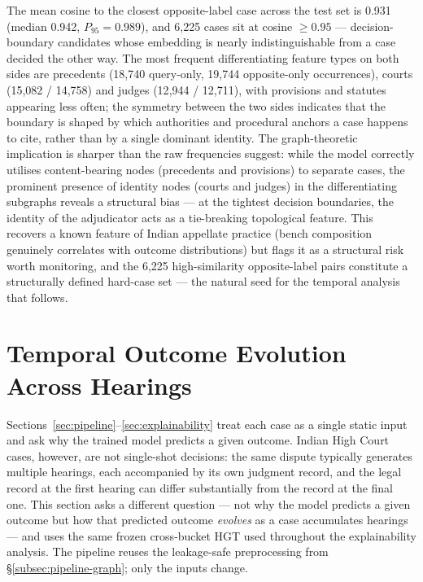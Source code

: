 \documentclass[runningheads]{llncs}
\begin{document}
The mean cosine to the closest opposite-label case across the test set is 0.931 (median 0.942, $P_{95}=0.989$), and 6{,}225 cases sit at cosine $\geq 0.95$ --- decision-boundary candidates whose embedding is nearly indistinguishable from a case decided the other way. The most frequent differentiating feature types on both sides are precedents (18{,}740 query-only, 19{,}744 opposite-only occurrences), courts (15{,}082 / 14{,}758) and judges (12{,}944 / 12{,}711), with provisions and statutes appearing less often; the symmetry between the two sides indicates that the boundary is shaped by which authorities and procedural anchors a case happens to cite, rather than by a single dominant identity. The graph-theoretic implication is sharper than the raw frequencies suggest: while the model correctly utilises content-bearing nodes (precedents and provisions) to separate cases, the prominent presence of identity nodes (courts and judges) in the differentiating subgraphs reveals a structural bias --- at the tightest decision boundaries, the identity of the adjudicator acts as a tie-breaking topological feature. This recovers a known feature of Indian appellate practice (bench composition genuinely correlates with outcome distributions) but flags it as a structural risk worth monitoring, and the 6{,}225 high-similarity opposite-label pairs constitute a structurally defined hard-case set --- the natural seed for the temporal analysis that follows.

\section{Temporal Outcome Evolution Across Hearings}
\label{sec:temporal}

Sections~\ref{sec:pipeline}--\ref{sec:explainability} treat each case as a single static input and ask why the trained model predicts a given outcome. Indian High Court cases, however, are not single-shot decisions: the same dispute typically generates multiple hearings, each accompanied by its own judgment record, and the legal record at the first hearing can differ substantially from the record at the final one. This section asks a different question --- not why the model predicts a given outcome but how that predicted outcome \emph{evolves} as a case accumulates hearings --- and uses the same frozen cross-bucket HGT used throughout the explainability analysis. The pipeline reuses the leakage-safe preprocessing from \S\ref{subsec:pipeline-graph}; only the inputs change.
\end{document}
